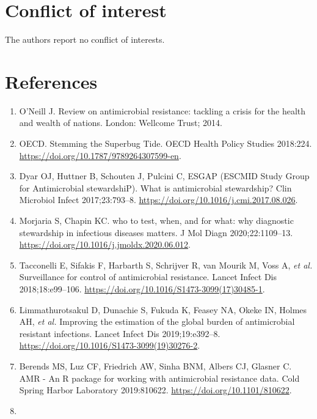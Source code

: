 \documentclass[
]{book}
\providecommand{\tightlist}{%
  \setlength{\itemsep}{0pt}\setlength{\parskip}{0pt}}
\begin{document}
\hypertarget{conflict-of-interest}{%
\section*{Conflict of interest}\label{conflict-of-interest}}

The authors report no conflict of interests.

\hypertarget{references-5}{%
\section*{References}\label{references-5}}

\begin{enumerate}
\def\labelenumi{\arabic{enumi}.}
\tightlist
\item
  O'Neill J. Review on antimicrobial resistance: tackling a crisis for the health and wealth of nations. London: Wellcome Trust; 2014.
\item
  OECD. Stemming the Superbug Tide. OECD Health Policy Studies 2018:224. \url{https://doi.org/10.1787/9789264307599-en}.
\item
  Dyar OJ, Huttner B, Schouten J, Pulcini C, ESGAP (ESCMID Study Group for Antimicrobial stewardshiP). What is antimicrobial stewardship? Clin Microbiol Infect 2017;23:793--8. \url{https://doi.org/10.1016/j.cmi.2017.08.026}.
\item
  Morjaria S, Chapin KC. who to test, when, and for what: why diagnostic stewardship in infectious diseases matters. J Mol Diagn 2020;22:1109--13. \url{https://doi.org/10.1016/j.jmoldx.2020.06.012}.
\item
  Tacconelli E, Sifakis F, Harbarth S, Schrijver R, van Mourik M, Voss A, \emph{et al.} Surveillance for control of antimicrobial resistance. Lancet Infect Dis 2018;18:e99--106. \url{https://doi.org/10.1016/S1473-3099(17)30485-1}.
\item
  Limmathurotsakul D, Dunachie S, Fukuda K, Feasey NA, Okeke IN, Holmes AH, \emph{et al.} Improving the estimation of the global burden of antimicrobial resistant infections. Lancet Infect Dis 2019;19:e392--8. \url{https://doi.org/10.1016/S1473-3099(19)30276-2}.
\item
  Berends MS, Luz CF, Friedrich AW, Sinha BNM, Albers CJ, Glasner C. AMR - An R package for working with antimicrobial resistance data. Cold Spring Harbor Laboratory 2019:810622. \url{https://doi.org/10.1101/810622}.
\item

\end{enumerate}
\end{document}
